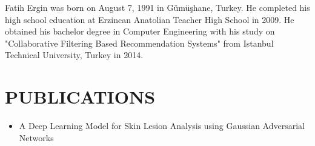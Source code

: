\curriculumvitae
\label{chapter:vita}

Fatih Ergin was born on August 7, 1991 in Gümüşhane, Turkey.
He completed his high school education at Erzincan Anatolian Teacher High School in 2009.
He obtained his bachelor degree in Computer Engineering with his study on
"Collaborative Filtering Based Recommendation Systems" from Istanbul Technical University, Turkey in 2014.


\section*{\uppercase{Publications}}

    \begin{itemize}
        \item A Deep Learning Model for Skin Lesion Analysis using Gaussian Adversarial Networks
    \end{itemize}
